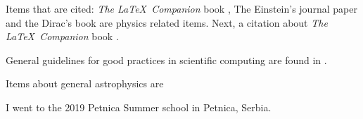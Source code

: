 \documentclass[../main/main.tex]{subfiles}
\begin{document}
Items that are cited: \textit{The \LaTeX\ Companion} book \cite{latexcompanion}, The Einstein's journal paper \cite{einstein} and the Dirac's book \cite{dirac} are physics related items. Next, a citation about \textit{The \LaTeX\ Companion} book \cite{latexcompanion}.

General guidelines for good practices in scientific computing are found in \cite{Wilson2014}.

Items about general astrophysics are

I went to the 2019 Petnica Summer school in Petnica, Serbia.
\end{document}
